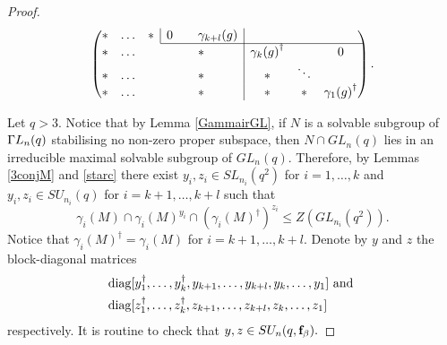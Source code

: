 \begin{proof}
\begin{equation*}
\begin{pmatrix}
   *     &\ldots &  \multicolumn{1}{l|}{*}&0 & &\multicolumn{1}{l|}{\gamma_{k+l}(g)}    &  &    & \\ \cline{4-9} 
    *    &\ldots & & & &\multicolumn{1}{l|}{*} & {{\gamma_{k}(g)}^{\dagger}}  &    &0 \\
    *    &\ldots & & & &\multicolumn{1}{l|}{*} &* & \ddots   &\\
*        &\ldots & & & &\multicolumn{1}{l|}{*} &* & *   & {{\gamma_{1}(g)}^{\dagger}} \\  
\end{pmatrix}.
\end{equation*}



Let $q>3.$ Notice that by Lemma \ref{GammairGL}, if $N$ is a solvable subgroup of ${{\Gamma L}}_n(q)$  stabilising no  non-zero proper subspace, then $N \cap GL_n(q)$ lies in an irreducible maximal  solvable subgroup of $GL_n(q).$ Therefore, by Lemmas \ref{3conjM}  and   \ref{starc}  there exist $y_i, z_i \in SL_{n_i}(q^2)$ for $i=1, \ldots, k$ and $y_i, z_i \in SU_{n_i}(q)$ for $i =k+1, \ldots, k+l$ such that 
\begin{equation}\label{smint}
\gamma_i(M) \cap \gamma_i(M)^{y_i} \cap (\gamma_i(M)^{\dagger})^{z_i}  \le Z(GL_{n_i}(q^2)). 
\end{equation}
Notice that $\gamma_i(M)^{\dagger} = \gamma_i(M)$ for $i=k+1, \ldots, k+l$. Denote by $y$ and $z$ the block-diagonal matrices 
\begin{equation}
\label{yzdef}
\begin{split}
&\mathrm{diag}[y_1^{\dagger}, \ldots, y_k^{\dagger}, y_{k+1}, \ldots, y_{k+l}, y_k, \ldots, y_1]  \text{ and }\\
&\mathrm{diag}[z_1^{\dagger}, \ldots, z_k^{\dagger}, z_{k+1}, \ldots, z_{k+l}, z_k, \ldots, z_1]
\end{split}
\end{equation}
 respectively. It is routine to check that $y,z \in SU_n(q,{\bf f}_{\beta}).$



\end{proof}
